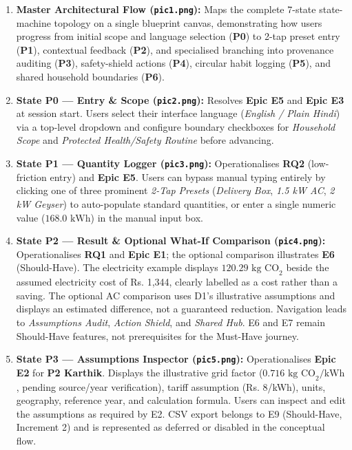 \documentclass[12pt, a4paper]{article}
\begin{document}
\begin{enumerate}[leftmargin=1.8em, itemsep=0.3em]
    \item \textbf{Master Architectural Flow (\texttt{pic1.png}):} Maps the complete 7-state state-machine topology on a single blueprint canvas, demonstrating how users progress from initial scope and language selection (\textbf{P0}) to 2-tap preset entry (\textbf{P1}), contextual feedback (\textbf{P2}), and specialised branching into provenance auditing (\textbf{P3}), safety-shield actions (\textbf{P4}), circular habit logging (\textbf{P5}), and shared household boundaries (\textbf{P6}).
    \item \textbf{State P0 --- Entry \& Scope (\texttt{pic2.png}):} Resolves \textbf{Epic E5} and \textbf{Epic E3} at session start. Users select their interface language (\textit{English / Plain Hindi}) via a top-level dropdown and configure boundary checkboxes for \textit{Household Scope} and \textit{Protected Health/Safety Routine} before advancing.
    \item \textbf{State P1 --- Quantity Logger (\texttt{pic3.png}):} Operationalises \textbf{RQ2} (low-friction entry) and \textbf{Epic E5}. Users can bypass manual typing entirely by clicking one of three prominent \textit{2-Tap Presets} (\textit{Delivery Box}, \textit{1.5 kW AC}, \textit{2 kW Geyser}) to auto-populate standard quantities, or enter a single numeric value ($168.0\text{ kWh}$) in the manual input box.
    \item \textbf{State P2 --- Result \& Optional What-If Comparison (\texttt{pic4.png}):} Operationalises \textbf{RQ1} and \textbf{Epic E1}; the optional comparison illustrates \textbf{E6} (Should-Have). The electricity example displays $120.29\text{ kg CO}_2$ beside the assumed electricity cost of Rs. 1,344, clearly labelled as a cost rather than a saving. The optional AC comparison uses D1's illustrative assumptions and displays an estimated difference, not a guaranteed reduction. Navigation leads to \textit{Assumptions Audit}, \textit{Action Shield}, and \textit{Shared Hub}. E6 and E7 remain Should-Have features, not prerequisites for the Must-Have journey.
    \item \textbf{State P3 --- Assumptions Inspector (\texttt{pic5.png}):} Operationalises \textbf{Epic E2} for \textbf{P2 Karthik}. Displays the illustrative grid factor ($0.716\text{ kg CO}_2\text{/kWh}$, pending source/year verification), tariff assumption (Rs. 8/kWh), units, geography, reference year, and calculation formula. Users can inspect and edit the assumptions as required by E2. CSV export belongs to E9 (Should-Have, Increment 2) and is represented as deferred or disabled in the conceptual flow.

\end{enumerate}
\end{document}
